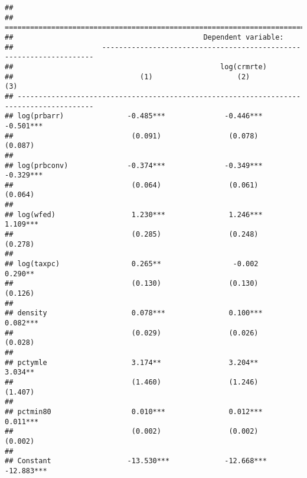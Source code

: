 \documentclass[]{article}
\begin{document}
\begin{verbatim}
## 
## ========================================================================================
##                                             Dependent variable:                         
##                     --------------------------------------------------------------------
##                                                 log(crmrte)                             
##                              (1)                    (2)                    (3)          
## ----------------------------------------------------------------------------------------
## log(prbarr)               -0.485***              -0.446***              -0.501***       
##                            (0.091)                (0.078)                (0.087)        
##                                                                                         
## log(prbconv)              -0.374***              -0.349***              -0.329***       
##                            (0.064)                (0.061)                (0.064)        
##                                                                                         
## log(wfed)                  1.230***               1.246***               1.109***       
##                            (0.285)                (0.248)                (0.278)        
##                                                                                         
## log(taxpc)                 0.265**                 -0.002                0.290**        
##                            (0.130)                (0.130)                (0.126)        
##                                                                                         
## density                    0.078***               0.100***               0.082***       
##                            (0.029)                (0.026)                (0.028)        
##                                                                                         
## pctymle                    3.174**                3.204**                3.034**        
##                            (1.460)                (1.246)                (1.407)        
##                                                                                         
## pctmin80                   0.010***               0.012***               0.011***       
##                            (0.002)                (0.002)                (0.002)        
##                                                                                         
## Constant                  -13.530***             -12.668***             -12.883***      

\end{verbatim}
\end{document}

